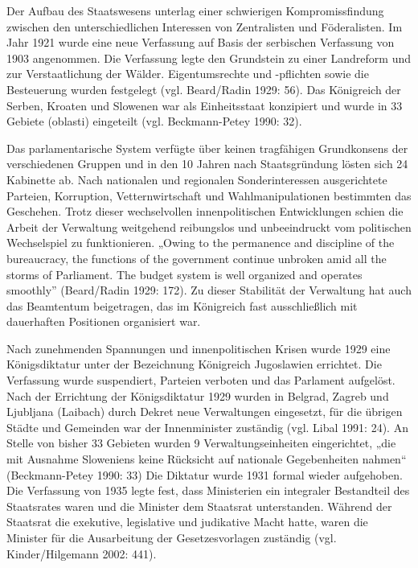 \par
Der Aufbau des Staatswesens unterlag einer schwierigen Kompromissfindung zwischen den unterschiedlichen Interessen von Zentralisten und Föderalisten. Im Jahr 1921 wurde eine neue Verfassung auf Basis der serbischen Verfassung von 1903 angenommen. Die Verfassung legte den Grundstein zu einer Landreform und zur Verstaatlichung der Wälder. Eigentumsrechte und -pflichten sowie die Besteuerung wurden festgelegt (vgl. Beard/Radin 1929: 56). Das Königreich der Serben, Kroaten und Slowenen war als Einheitsstaat konzipiert und wurde in 33 Gebiete (oblasti) eingeteilt (vgl. Beckmann-Petey 1990: 32).\par
Das parlamentarische System verfügte über keinen tragfähigen Grundkonsens der verschiedenen Gruppen und in den 10 Jahren nach Staatsgründung lösten sich 24 Kabinette ab. Nach nationalen und regionalen Sonderinteressen ausgerichtete Parteien, Korruption, Vetternwirtschaft und Wahlmanipulationen bestimmten das Geschehen. Trotz dieser wechselvollen innenpolitischen Entwicklungen schien die Arbeit der Verwaltung weitgehend reibungslos und unbeeindruckt vom politischen Wechselspiel zu funktionieren. „Owing to the permanence and discipline of the bureaucracy, the functions of the government continue unbroken amid all the storms of Parliament. The budget system is well organized and operates smoothly” (Beard/Radin 1929: 172). Zu dieser Stabilität der Verwaltung hat auch das Beamtentum beigetragen, das im Königreich fast ausschließlich mit dauerhaften Positionen organisiert war.\par
Nach zunehmenden Spannungen und innenpolitischen Krisen wurde 1929 eine Königsdiktatur unter der Bezeichnung Königreich Jugoslawien errichtet. Die Verfassung wurde suspendiert, Parteien verboten und das Parlament aufgelöst. Nach der Errichtung der Königsdiktatur 1929 wurden in Belgrad, Zagreb und Ljubljana (Laibach) durch Dekret neue Verwaltungen eingesetzt, für die übrigen Städte und Gemeinden war der Innenminister zuständig (vgl. Libal 1991: 24). An Stelle von bisher 33 Gebieten wurden 9 Verwaltungseinheiten eingerichtet, „die mit Ausnahme Sloweniens keine Rücksicht auf nationale Gegebenheiten nahmen“ (Beckmann-Petey 1990: 33) Die Diktatur wurde 1931 formal wieder aufgehoben. Die Verfassung von 1935 legte fest, dass Ministerien ein integraler Bestandteil des Staatsrates waren und die Minister dem Staatsrat unterstanden. Während der Staatsrat die exekutive, legislative und judikative Macht hatte, waren die Minister für die Ausarbeitung der Gesetzesvorlagen zuständig (vgl. Kinder/Hilgemann 2002: 441).

